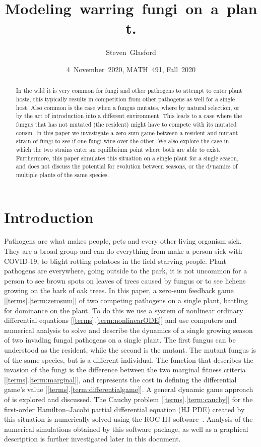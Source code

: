 \documentclass[11pt]{amsart}
\author{Steven~Glasford}
\title{Modeling~warring~fungi~on~a~plant.}
\begin{document}
\date{4~November~2020, MATH~491, Fall~2020}

\maketitle

\begin{abstract}
    In the wild it is very common for fungi and other pathogens to attempt to enter plant hosts, this typically results in competition from other pathogens as well for a single host. Also common is the case when a fungus mutates, where by natural selection, or by the act of introduction into a different environment. This leads to a case where the fungus that has not mutated (the resident) might have to compete with its mutated cousin. In this paper we investigate a zero sum game between a resident and mutant strain of fungi to see if one fungi wins over the other. We also explore the case in which the two strains enter an equilibrium point where both are able to exist. Furthermore, this paper simulates this situation on a single plant for a single season, and does not discuss the potential for evolution between seasons, or the dynamics of multiple plants of the same species.
\end{abstract}


\section{Introduction}
Pathogens are what makes people, pets and every other living organism sick. They are a broad group and can do everything from make a person sick with COVID-19, to blight rotting potatoes in the field starving people. Plant pathogens are everywhere, going outside to the park, it is not uncommon for a person to see brown spots on leaves of trees caused by fungus or to see lichens growing on the bark of oak trees. In this paper, a zero-sum feedback game [\ref{terms}.\ref{term:zerosum}] of two competing pathogens on a single plant, battling for dominance on the plant. To do this we use a system of nonlinear ordinary differential equations [\ref{terms}.\ref{term:nonlinearODE}] and use computers and numerical analysis to solve and describe the dynamics of a single growing season of two invading fungal pathogens on a single plant. The first fungus can be understood as the resident, while the second is the mutant. The mutant fungus is of the same species, but is a different individual.  The function that describes the invasion of the fungi is the difference between the two marginal fitness criteria [\ref{terms}.\ref{term:marginal}], and represents the cost in defining the  differential game's value [\ref{terms}.\ref{term:differentialgame}].  A general dynamic game approach of \cite{YegorovGrognardMailleretHalkettBernhard2019} is explored and discussed. The Cauchy problem [\ref{terms}.\ref{term:cauchy}] for the first-order Hamilton--Jacobi partial differential equation (HJ PDE) created by this situation is numerically solved using the ROC-HJ software~\cite{ROCHJ2019}. Analysis of the numerical simulations obtained by this software package, as well as a graphical description is further investigated later in this document.
\end{document}
